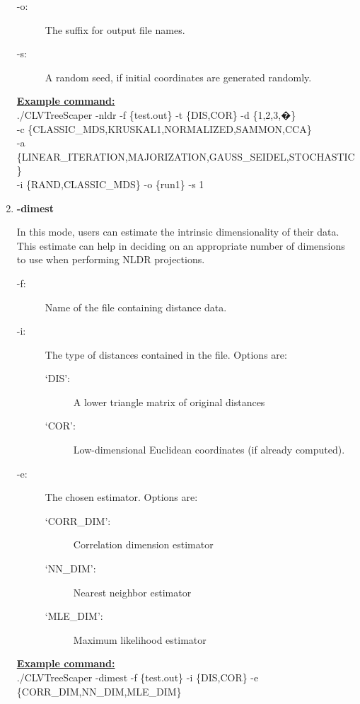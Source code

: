\documentclass[11pt]{article}
\begin{document}
\begin{enumerate}[{\bf (1)}]
\begin{description}
	\item[-o:] The suffix for output file names.
	
	\item[-s:] A random seed, if initial coordinates are generated randomly.
	\end{description}

\vspace{0.5 cm}	
	
\ul{\bf Example command:}\\
./CLVTreeScaper -nldr -f \{test.out\} -t \{DIS,COR\} -d \{1,2,3,�\} \\
-c \{CLASSIC\_MDS,KRUSKAL1,NORMALIZED,SAMMON,CCA\} \\
-a \{LINEAR\_ITERATION,MAJORIZATION,GAUSS\_SEIDEL,STOCHASTIC\} \\
-i \{RAND,CLASSIC\_MDS\} -o \{run1\} -s 1 \\


\item {\bf -dimest}

In this mode, users can estimate the intrinsic dimensionality of their data. This estimate can
help in deciding on an appropriate number of dimensions to use when performing NLDR
projections.
	\begin{description}
	\item[-f:] Name of the file containing distance data.
	
	\item[-i:] The type of distances contained in the file. Options are:
		\begin{description}
		\item[`DIS':] A lower triangle matrix of original distances
		\item[`COR':] Low-dimensional Euclidean coordinates (if already computed).
		\end{description}
	
	\item[-e:] The chosen estimator. Options are:
		\begin{description}
		\item[`CORR\_DIM':] Correlation dimension estimator
		\item[`NN\_DIM':] Nearest neighbor estimator
		\item[`MLE\_DIM':] Maximum likelihood estimator
		\end{description}
	\end{description}

\ul{\bf Example command:}\\
./CLVTreeScaper -dimest -f \{test.out\} -i \{DIS,COR\} -e \{CORR\_DIM,NN\_DIM,MLE\_DIM\} \\
\end{enumerate}
\end{document}
